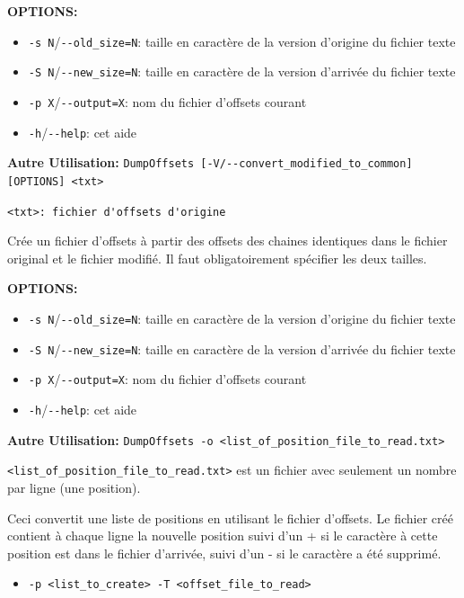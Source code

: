 \bigskip
\noindent \textbf{OPTIONS:}
	  	 
\begin{itemize} 	 
  \item \verb+-s N+/\verb+--old_size=N+: taille en caractère de la version d'origine du fichier texte
  \item \verb+-S N+/\verb+--new_size=N+: taille en caractère de la version d'arrivée du fichier texte
  \item \verb+-p X+/\verb+--output=X+: nom du fichier d'offsets courant	 
  \item \verb+-h+/\verb+--help+: cet aide
\end{itemize} 	 

\bigskip
\noindent \textbf{Autre Utilisation:} \verb+DumpOffsets [-V/--convert_modified_to_common] [OPTIONS] <txt>+

\bigskip
\noindent \verb+<txt>: fichier d'offsets d'origine+

\bigskip
\noindent Crée un fichier d'offsets à partir des offsets des chaines identiques dans le fichier original et le fichier modifié.
Il faut obligatoirement spécifier les deux tailles.
	
\bigskip
\noindent \textbf{OPTIONS:}
	  	 
\begin{itemize} 	 
  \item \verb+-s N+/\verb+--old_size=N+: taille en caractère de la version d'origine du fichier texte
  \item \verb+-S N+/\verb+--new_size=N+: taille en caractère de la version d'arrivée du fichier texte
  \item \verb+-p X+/\verb+--output=X+: nom du fichier d'offsets courant	 
  \item \verb+-h+/\verb+--help+: cet aide	 
\end{itemize} 	 

\bigskip
\noindent \textbf{Autre Utilisation:} \verb+DumpOffsets -o <list_of_position_file_to_read.txt>+

\bigskip
\noindent \verb+<list_of_position_file_to_read.txt>+ est un fichier avec seulement un nombre par ligne (une position).

\bigskip
\noindent Ceci convertit une liste de positions en utilisant le fichier d'offsets.
	  Le fichier créé contient à chaque ligne la nouvelle position suivi d'un +  si le caractère à cette position 
	  est dans le fichier d'arrivée, suivi d'un - si le caractère a été supprimé.
	  	 
\begin{itemize}
  \item \verb+-p <list_to_create> -T <offset_file_to_read>+
\end{itemize} 	 

